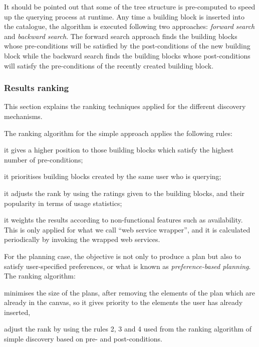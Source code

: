 It should be pointed out that some of the tree structure is pre-computed to speed up the querying process at runtime. 
Any time a building block is inserted into the catalogue, the algorithm is executed following two approaches: 
\emph{forward search} and \emph{backward search}. The forward search approach finds the building blocks whose 
pre-conditions will be satisfied by the post-conditions of the new building block while the backward search 
finds the building blocks whose post-conditions will satisfy the pre-conditions of the recently
created building block.

\subsubsection{Results ranking}
\label{sssec:ranking}

This section explains the ranking techniques applied for the different discovery mechanisms.

The ranking algorithm for the simple approach applies the following rules:
\begin{inparaenum}[(1)]
	\item it gives a higher position to those building blocks which satisfy the highest number of pre-conditions;
	\item it prioritises building blocks created by the same user who is querying;
	\item it adjusts the rank by using the ratings given to the building blocks, and their popularity in terms of usage statistics;
	\item it weights the results according to non-functional features such as availability. This is only applied for what we call ``web service wrapper'', and it is calculated periodically by invoking the wrapped web services.
\end{inparaenum}

For the planning case, the objective is not only to produce a plan but also to satisfy user-specified preferences, or what is
known as \emph{preference-based planning}. The ranking algorithm:
\begin{inparaenum}[(1)]
 \item minimises the size of the plans, after removing the elements of the plan which are already in the canvas, so it gives
priority to the elements the user has already inserted,
 \item adjust the rank by using the rules 2, 3 and 4 used from the ranking algorithm of simple discovery based on 
pre- and post-conditions.
\end{inparaenum}
